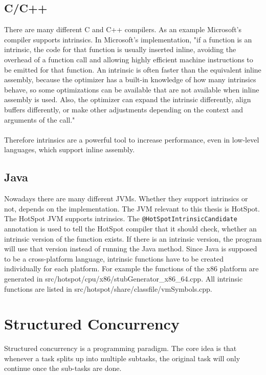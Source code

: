 \subsection{C/C++}
There are many different C and C++ compilers. As an example Microsoft's compiler supports intrinsics. In Microsoft's implementation, "if a function is an intrinsic, the code for that function is usually inserted inline, avoiding the overhead of a function call and allowing highly efficient machine instructions to be emitted for that function. An intrinsic is often faster than the equivalent inline assembly, because the optimizer has a built-in knowledge of how many intrinsics behave, so some optimizations can be available that are not available when inline assembly is used. Also, the optimizer can expand the intrinsic differently, align buffers differently, or make other adjustments depending on the context and arguments of the call." \cite{Microsoft:intrinsics}
\\
\\
Therefore intrinsics are a powerful tool to increase performance, even in low-level languages, which support inline assembly.


\subsection{Java}
Nowadays there are many different JVMs. Whether they support intrinsics or not, depends on the implementation. The JVM relevant to this thesis is HotSpot.
The HotSpot JVM supports intrinsics. The \lstinline[basicstyle=\ttfamily\color{orange}]{@HotSpotIntrinsicCandidate} annotation is used to tell the HotSpot compiler that it should check, whether an intrinsic version of the function exists. If there is an intrinsic version, the program will use that version instead of running the Java method. Since Java is supposed to be a cross-platform language, intrinsic functions have to be created individually for each platform.
For example the functions of the x86 platform are generated in src/hotspot/cpu/x86/stubGenerator\_x86\_64.cpp.
All intrinsic functions are listed in src/hotspot/share/classfile/vmSymbols.cpp.
\cite{Mok:intrinsics}

\section{Structured Concurrency}
Structured concurrency is a programming paradigm. The core idea is that whenever a task splits up into multiple subtasks, the original task will only continue once the sub-tasks are done.

